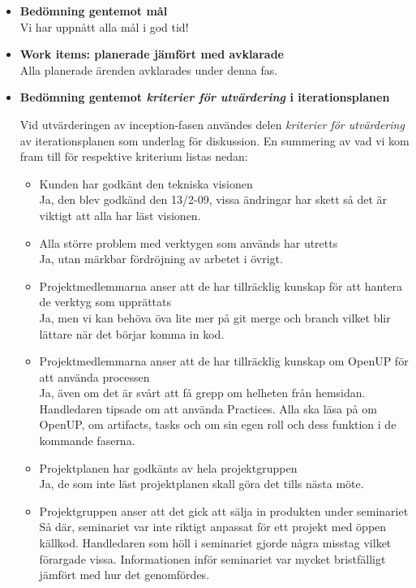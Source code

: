 \begin{itemize}
	\item \textbf{Bedömning gentemot mål}
	\\ Vi har uppnått alla mål i god tid!
	\item \textbf{Work items: planerade jämfört med avklarade}
	\\ Alla planerade ärenden avklarades under denna fas.
	\item \textbf{Bedömning gentemot \textit{kriterier för utvärdering} i iterationsplanen}
	
	Vid utvärderingen av inception-fasen användes delen \textit{kriterier för utvärdering} av iterationsplanen som underlag för diskussion. En summering av vad vi kom fram till för respektive kriterium listas nedan:
	
	\begin{itemize}
		\item Kunden har godkänt den tekniska visionen
		\\ Ja, den blev godkänd den 13/2-09, vissa ändringar har skett så det är viktigt att alla har läst visionen.

		\item Alla större problem med verktygen som används har utretts
		\\ Ja, utan märkbar fördröjning av arbetet i övrigt.

		\item Projektmedlemmarna anser att de har tillräcklig kunskap för att hantera de verktyg som upprättats
		\\ Ja, men vi kan behöva öva lite mer på git merge och branch vilket blir lättare när det börjar komma in kod.

		\item Projektmedlemmarna anser att de har tillräcklig kunskap om OpenUP för att använda processen
		\\ Ja, även om det är svårt att få grepp om helheten från hemsidan.
		Handledaren tipsade om att använda Practices. Alla ska läsa på om OpenUP, om artifacts, tasks och om sin egen roll och dess funktion i de kommande faserna.

		\item Projektplanen har godkänts av hela projektgruppen
		\\ Ja, de som inte läst projektplanen skall göra det tills nästa möte.

		\item Projektgruppen anser att det gick att sälja in produkten under seminariet
		\\ Så där, seminariet var inte riktigt anpassat för ett projekt med öppen källkod. Handledaren som höll i seminariet gjorde några misstag vilket förargade vissa. Informationen inför seminariet var mycket bristfälligt jämfört med hur det genomfördes.


\end{itemize}
\end{itemize}
